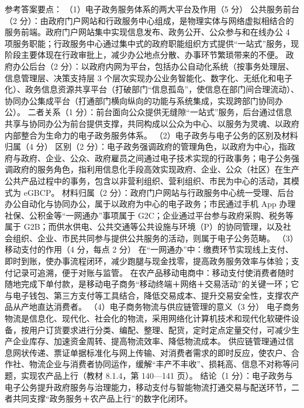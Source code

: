 \documentclass[a4paper,11pt]{article}
\begin{document}
\q 参考答案要点：
（1）电子政务服务体系的两大平台及作用（5 分）
公共服务前台（2 分）：由政府门户网站和行政服务中心组成，是物理实体与网络虚拟相结合的服务前端。政府门户网站集中实现信息发布、政务公开、公众参与和在线办公 4 项服务职能；行政服务中心通过集中式的政府职能组织方式提供“一站式”服务，现阶段主要体现在行政审批上，减少办公地点分散、办事环节繁琐带来的不便。
政府办公后台（2 分）：以政府内网为平台，包括办公自动化系统（按事务处理层、信息管理层、决策支持层 3 个层次实现办公业务智能化、数字化、无纸化和电子化）、政务信息资源共享平台（打破部门“信息孤岛”，使信息在部门间合理流动）、协同办公集成平台（打通部门横向纵向的功能与系统集成，实现跨部门协同办公）。
二者关系（1 分）：前台面向公众提供无缝隙“一站式”服务，后台通过信息共享与协同办公为前台提供支撑，共同构成以公众为中心、以服务为灵魂、以政府内部整合为生命力的电子政务服务体系。
（2）电子政务与电子公务的区别及材料归属（4 分）
区别（2 分）：电子政务强调政府的管理角色，以政府为中心，指政府与政府、企业、公众、政府雇员之间通过电子技术实现的行政事务；电子公务强调政府的服务角色，指利用信息化手段高效实现政府、企业、公众（社区）在生产公共产品过程中的事务，包含以非营利组织、营利组织、市民为中心的活动，其模式为 eGBCP。
材料归属（2 分）：政府门户网站与行政服务中心统一受理、后台办公自动化与协同办公，属于以政府为中心的电子政务；市民通过手机 App 办理社保、公积金等“一网通办”事项属于 G2C；企业通过平台参与政府采购、税务等属于 G2B；而供水供电、公共交通等公共设施与环境（P）的协同管理，以及社会组织、企业、市民共同参与提供公共服务的活动，则属于电子公务范畴。
（3）移动支付的作用（4 分，每点 2 分）
在“一网通办”中：缴费环节实现线上支付、即时到账，使办事流程闭环，减少跑腿与现金找零，提高政务服务效率与体验；支付记录可追溯，便于对账与监管。
在农产品移动电商中：移动支付使消费者随时随地完成下单付款，是移动电子商务“移动终端＋网络＋交易活动”的关键一环；它与电子钱包、第三方支付等工具结合，降低交易成本、提升交易安全性，支撑农产品从产地直达消费者。
（4）电子商务物流与供应链管理的意义（3 分）
电子商务物流是信息化、现代化、社会化的物流，采用网络化计算机技术和现代化软硬件设备，按用户订货要求进行分类、编配、整理、配货，定时定点定量交付，可减少生产企业库存、加速资金周转、提高物流效率、降低物流成本。
供应链管理通过信息网状传递、票证单据标准化与网上传输、对消费者需求的即时反应，使农户、合作社、物流企业与消费者协同运作，缓解“丰产不丰收”、损耗高、信息不对称等问题，实现农产品上行（教材 8.1.4，第 140—141 页）。
结论（1 分）：电子政务与电子公务提升政府服务与治理能力，移动支付与智能物流打通交易与配送环节，二者共同支撑“政务服务＋农产品上行”的数字化闭环。
\end{document}
